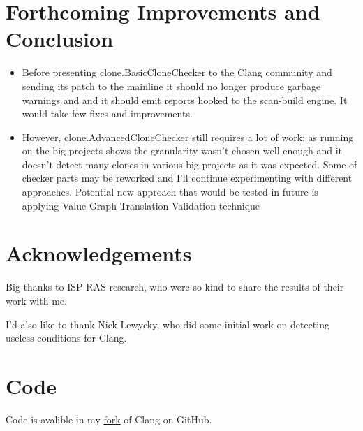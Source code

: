 \documentclass[a0,portrait]{a0poster}
\begin{document}
\begin{multicols}{2}
\section*{Forthcoming Improvements and Conclusion}

\begin{itemize}
\item Before presenting clone.BasicCloneChecker to the Clang community and sending its patch to 
the mainline it should no longer produce garbage warnings and and it should emit reports hooked to 
the scan-build engine. It would take few fixes and improvements.
\item However, clone.AdvancedCloneChecker still requires a lot of work: as running on the big 
projects shows the granularity wasn't chosen well enough and it doesn't detect many clones in
various big projects as it was expected. Some of checker parts may be reworked and I'll continue
experimenting with different approaches. Potential new approach that would be tested in future
is applying Value Graph Translation Validation technique \cite{ValueGraphLLVM}
\end{itemize}


\nocite{*} %


\section*{Acknowledgements}

Big thanks to ISP RAS research, who were so kind to share the results of their work with me.

I'd also like to thank Nick Lewycky, who did some initial work on detecting useless conditions
for Clang.


\section*{Code}

Code is avalible in my \href{https://github.com/omtcyf0/clang}{\color{blue} fork} of Clang on
GitHub.


\end{multicols}
\end{document}
